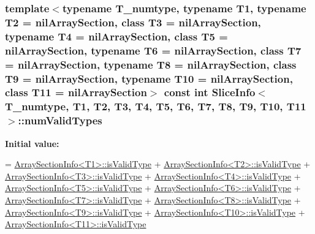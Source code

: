 \subsubsection[{num\+Valid\+Types}]{\setlength{\rightskip}{0pt plus 5cm}template$<$typename T\+\_\+numtype, typename T1, typename T2 = nil\+Array\+Section, class T3  = nil\+Array\+Section, typename T4  = nil\+Array\+Section, class T5  = nil\+Array\+Section, typename T6  = nil\+Array\+Section, class T7  = nil\+Array\+Section, typename T8  = nil\+Array\+Section, class T9  = nil\+Array\+Section, typename T10  = nil\+Array\+Section, class T11  = nil\+Array\+Section$>$ const int {\bf Slice\+Info}$<$ T\+\_\+numtype, T1, T2, T3, T4, T5, T6, T7, T8, T9, T10, T11 $>$\+::num\+Valid\+Types\hspace{0.3cm}{\ttfamily [static]}}\label{classSliceInfo_acab30466f2e1e0506c1a9caddc18dd5f}
{\bfseries Initial value\+:}
\begin{DoxyCode}
= \hyperlink{classArraySectionInfo}{ArraySectionInfo<T1>::isValidType}
                      + \hyperlink{classArraySectionInfo}{ArraySectionInfo<T2>::isValidType}
                      + \hyperlink{classArraySectionInfo}{ArraySectionInfo<T3>::isValidType}
                      + \hyperlink{classArraySectionInfo}{ArraySectionInfo<T4>::isValidType}
                      + \hyperlink{classArraySectionInfo}{ArraySectionInfo<T5>::isValidType}
                      + \hyperlink{classArraySectionInfo}{ArraySectionInfo<T6>::isValidType}
                      + \hyperlink{classArraySectionInfo}{ArraySectionInfo<T7>::isValidType}
                      + \hyperlink{classArraySectionInfo}{ArraySectionInfo<T8>::isValidType}
                      + \hyperlink{classArraySectionInfo}{ArraySectionInfo<T9>::isValidType}
                      + \hyperlink{classArraySectionInfo}{ArraySectionInfo<T10>::isValidType}
                      + \hyperlink{classArraySectionInfo}{ArraySectionInfo<T11>::isValidType}
\end{DoxyCode}
\hypertarget{classSliceInfo_ae103c298c90e60cea21b2f01b088d374}{}

